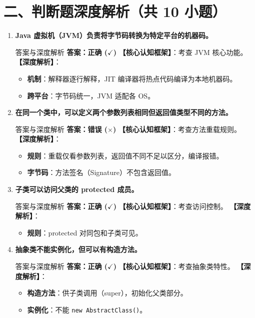 \documentclass[12pt, a4paper]{ctexart}
\newcommand{\code}[1]{\texttt{#1}}
\begin{document}
\section*{二、判断题深度解析（共 10 小题）}

\begin{enumerate}[label=\textbf{\arabic*.}, leftmargin=*, itemsep=1.5em]
\item \textbf{Java 虚拟机（JVM）负责将字节码转换为特定平台的机器码。}
\begin{bluebox}{答案与深度解析}
\textbf{答案：正确 ($\checkmark$)}
\textbf{【核心认知框架】}：考查 JVM 核心功能。
\textbf{【深度解析】}：
\begin{itemize}[leftmargin=*, nosep]
    \item \textbf{机制}：解释器逐行解释，JIT 编译器将热点代码编译为本地机器码。
    \item \textbf{跨平台}：字节码统一，JVM 适配各 OS。
\end{itemize}
\end{bluebox}

\item \textbf{在同一个类中，可以定义两个参数列表相同但返回值类型不同的方法。}
\begin{bluebox}{答案与深度解析}
\textbf{答案：错误 ($\times$)}
\textbf{【核心认知框架】}：考查方法重载规则。
\textbf{【深度解析】}：
\begin{itemize}[leftmargin=*, nosep]
    \item \textbf{规则}：重载仅看参数列表，返回值不同不足以区分，编译报错。
    \item \textbf{字节码}：方法签名（Signature）不包含返回值。
\end{itemize}
\end{bluebox}

\item \textbf{子类可以访问父类的 protected 成员。}
\begin{bluebox}{答案与深度解析}
\textbf{答案：正确 ($\checkmark$)}
\textbf{【核心认知框架】}：考查访问控制。
\textbf{【深度解析】}：
\begin{itemize}[leftmargin=*, nosep]
    \item \textbf{规则}：protected 对同包和子类可见。
\end{itemize}
\end{bluebox}

\item \textbf{抽象类不能实例化，但可以有构造方法。}
\begin{bluebox}{答案与深度解析}
\textbf{答案：正确 ($\checkmark$)}
\textbf{【核心认知框架】}：考查抽象类特性。
\textbf{【深度解析】}：
\begin{itemize}[leftmargin=*, nosep]
    \item \textbf{构造方法}：供子类调用（super），初始化父类部分。
    \item \textbf{实例化}：不能 \code{new AbstractClass()}。
\end{itemize}
\end{bluebox}


\end{enumerate}
\end{document}
